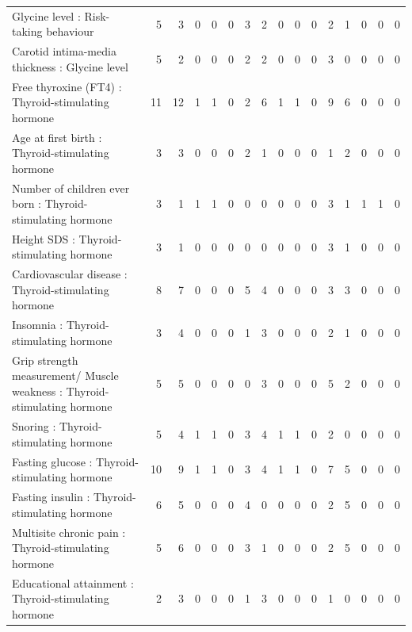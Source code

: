 \begin{table}[ht]
\begin{tabular}{lrrrrrrrrrrrrrrr}
  Glycine level  : Risk-taking behaviour &   5 &   3 &   0 &   0 &   0 &   3 &   2 &   0 &   0 &   0 &   2 &   1 &   0 &   0 &   0 \\ 
  Carotid intima-media thickness : Glycine level  &   5 &   2 &   0 &   0 &   0 &   2 &   2 &   0 &   0 &   0 &   3 &   0 &   0 &   0 &   0 \\ 
  Free thyroxine (FT4) : Thyroid-stimulating hormone  &  11 &  12 &   1 &   1 &   0 &   2 &   6 &   1 &   1 &   0 &   9 &   6 &   0 &   0 &   0 \\ 
  Age at first birth  : Thyroid-stimulating hormone  &   3 &   3 &   0 &   0 &   0 &   2 &   1 &   0 &   0 &   0 &   1 &   2 &   0 &   0 &   0 \\ 
  Number of children ever born  : Thyroid-stimulating hormone  &   3 &   1 &   1 &   1 &   0 &   0 &   0 &   0 &   0 &   0 &   3 &   1 &   1 &   1 &   0 \\ 
  Height SDS : Thyroid-stimulating hormone  &   3 &   1 &   0 &   0 &   0 &   0 &   0 &   0 &   0 &   0 &   3 &   1 &   0 &   0 &   0 \\ 
  Cardiovascular disease : Thyroid-stimulating hormone  &   8 &   7 &   0 &   0 &   0 &   5 &   4 &   0 &   0 &   0 &   3 &   3 &   0 &   0 &   0 \\ 
  Insomnia : Thyroid-stimulating hormone  &   3 &   4 &   0 &   0 &   0 &   1 &   3 &   0 &   0 &   0 &   2 &   1 &   0 &   0 &   0 \\ 
  Grip strength measurement/ Muscle weakness : Thyroid-stimulating hormone  &   5 &   5 &   0 &   0 &   0 &   0 &   3 &   0 &   0 &   0 &   5 &   2 &   0 &   0 &   0 \\ 
  Snoring : Thyroid-stimulating hormone  &   5 &   4 &   1 &   1 &   0 &   3 &   4 &   1 &   1 &   0 &   2 &   0 &   0 &   0 &   0 \\ 
  Fasting glucose : Thyroid-stimulating hormone  &  10 &   9 &   1 &   1 &   0 &   3 &   4 &   1 &   1 &   0 &   7 &   5 &   0 &   0 &   0 \\ 
  Fasting insulin : Thyroid-stimulating hormone  &   6 &   5 &   0 &   0 &   0 &   4 &   0 &   0 &   0 &   0 &   2 &   5 &   0 &   0 &   0 \\ 
  Multisite chronic pain : Thyroid-stimulating hormone  &   5 &   6 &   0 &   0 &   0 &   3 &   1 &   0 &   0 &   0 &   2 &   5 &   0 &   0 &   0 \\ 
  Educational attainment : Thyroid-stimulating hormone  &   2 &   3 &   0 &   0 &   0 &   1 &   3 &   0 &   0 &   0 &   1 &   0 &   0 &   0 &   0 \\ 

\end{tabular}
\end{table}
